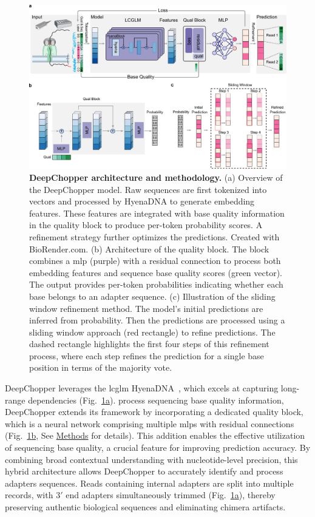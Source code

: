 \documentclass[pdflatex,sn-nature, lineno]{sn-jnl}%
\newcommand{\figref}[2]{Fig.~\hyperref[#1]{\ref*{#1}#2}}
\begin{document}
\begin{figure}[!ht]
	\includegraphics[height=0.63\columnwidth]{finals/figure1}
	\caption{{\bf DeepChopper architecture and methodology.} (a) Overview of the DeepChopper model. Raw sequences are first tokenized into vectors and processed by HyenaDNA to generate embedding features. These features are integrated with base quality information in the quality block to produce per-token probability scores. A refinement strategy further optimizes the predictions. Created with BioRender.com. (b) Architecture of the quality block. The block combines a \gls{mlp} (purple) with a residual connection to process both embedding features and sequence base quality scores (green vector). The output provides per-token probabilities indicating whether each base belongs to an adapter sequence. (c) Illustration of the sliding window refinement method. The model's initial predictions are inferred from probability. Then the predictions are processed using a sliding window approach (red rectangle) to refine predictions. The dashed rectangle highlights the first four steps of this refinement process, where each step refines the prediction for a single base position in terms of the majority vote.}\label{fig:f1}
\end{figure}

DeepChopper leverages the \gls{lcglm} HyenaDNA~\cite{nguyen2024hyenadna}, which excels at capturing long-range dependencies (\figref{fig:f1}{a}).
process sequencing base quality information, DeepChopper extends its framework by incorporating a dedicated quality block, which is a neural network comprising multiple \glspl{mlp} with residual connections~\cite{he2015deep} (\figref{fig:f1}{b}, See \hyperref[sec:methods]{Methods} for details).
This addition enables the effective utilization of sequencing base quality, a crucial feature for improving prediction accuracy.
By combining broad contextual understanding with nucleotide-level precision, this hybrid architecture allows DeepChopper to accurately identify and process adapters sequences.
Reads containing internal adapters are split into multiple records, with $3'$ end adapters simultaneously trimmed (\figref{fig:f1}{a}), thereby preserving authentic biological sequences and eliminating chimera artifacts.
\end{document}
